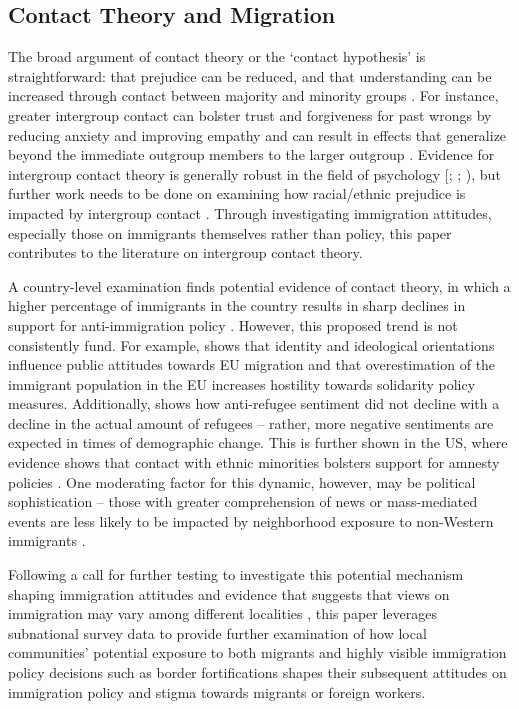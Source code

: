 \documentclass[12pt,]{article}
\begin{document}
\subsection{Contact Theory and
Migration}\label{contact-theory-and-migration}

The broad argument of contact theory or the `contact hypothesis' is
straightforward: that prejudice can be reduced, and that understanding
can be increased through contact between majority and minority groups
\citep{pettigrew2006, allport1970}. For instance, greater intergroup
contact can bolster trust and forgiveness for past wrongs by reducing
anxiety and improving empathy and can result in effects that generalize
beyond the immediate outgroup members to the larger outgroup
\citep{pettigrew2011}. Evidence for intergroup contact theory is
generally robust in the field of psychology {[}\citet{pettigrew2006};
\citet{paluck2019}; \citet{pettigrew2011}), but further work needs to be
done on examining how racial/ethnic prejudice is impacted by intergroup
contact \citep{paluck2019}. Through investigating immigration attitudes,
especially those on immigrants themselves rather than policy, this paper
contributes to the literature on intergroup contact theory.

A country-level examination finds potential evidence of contact theory,
in which a higher percentage of immigrants in the country results in
sharp declines in support for anti-immigration policy \citep{young2018}.
However, this proposed trend is not consistently fund. For example,
\citet{basile2020} shows that identity and ideological orientations
influence public attitudes towards EU migration and that overestimation
of the immigrant population in the EU increases hostility towards
solidarity policy measures. Additionally, \citet{czymara2021} shows how
anti-refugee sentiment did not decline with a decline in the actual
amount of refugees -- rather, more negative sentiments are expected in
times of demographic change. This is further shown in the US, where
evidence shows that contact with ethnic minorities bolsters support for
amnesty policies \citep{ayers2009}. One moderating factor for this
dynamic, however, may be political sophistication -- those with greater
comprehension of news or mass-mediated events are less likely to be
impacted by neighborhood exposure to non-Western immigrants
\citep{danckert2017}.

Following a call for further testing to investigate this potential
mechanism shaping immigration attitudes \citep{young2018} and evidence
that suggests that views on immigration may vary among different
localities \citep{arvanitidis2021}, this paper leverages subnational
survey data to provide further examination of how local communities'
potential exposure to both migrants and highly visible immigration
policy decisions such as border fortifications shapes their subsequent
attitudes on immigration policy and stigma towards migrants or foreign
workers.
\end{document}
